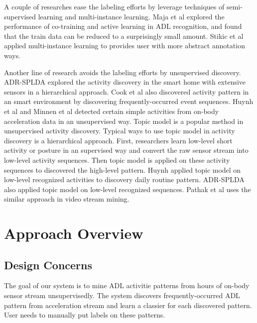 \documentclass{sigchi}
\begin{document}
A couple of researches ease the labeling efforts by leverage techniques of semi-supervised learning and multi-instance learning.
Maja et al \cite{stikic2008exploring} explored the performance of co-training and active learning in ADL recognition, and found that the train data can be reduced to a surprisingly small amount.
Stikic et al \cite{stikic2009activity} applied multi-instance learning to provides user with more abstract annotation ways.

Another line of research avoids the labeling efforts by unsupervised discovery.
ADR-SPLDA \cite{chikhaoui2012adr} explored the activity discovery in the smart home with extensive sensors in a hierarchical approach. Cook et al\cite{cook2013activity} also discovered activity pattern in an smart environment by discovering frequently-occurred event sequences.
Huynh et al \cite{huynh2006unsupervised} and Minnen et al \cite{minnen2006discovering} detected certain simple activities from on-body acceleration data in an unsupervised way. Topic model is a popular method in unsupervised activity discovery.
Typical ways to use topic model in activity discovery is a hierarchical approach.
First, researchers learn low-level short activity or posture in an supervised way and convert the raw sensor stream into low-level activity sequences.
Then topic model is applied on these activity sequences to discovered the high-level pattern.
Huynh \cite{huynh2008discovery} applied topic model on low-level recognized activities to discovery daily routine pattern.
ADR-SPLDA \cite{chikhaoui2012adr} also applied topic model on low-level recognized sequences.
Pathak et al \cite{wang2009human} uses the similar approach in video stream mining.


\section{Approach Overview}
\label{sec.overview}

    \subsection{Design Concerns}
    The goal of our system is to mine ADL activitie patterns from hours of on-body sensor stream unsupervisedly.
    The system discovers frequently-occurred ADL pattern from acceleration stream and learn a classier for each discovered pattern.
    User needs to manually put labels on these patterns.
\end{document}
